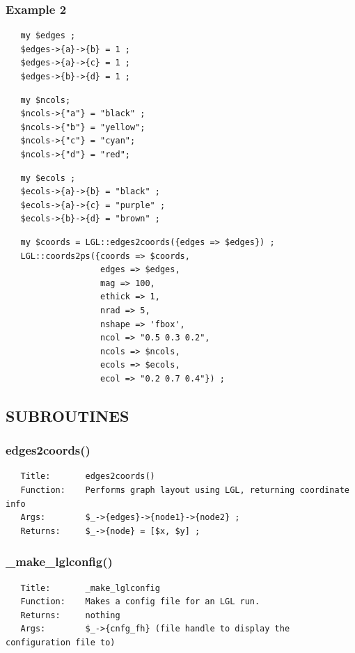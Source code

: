 \documentclass{article}
\begin{document}
\subsubsection*{Example 2\label{LGL_pm_Example_2}}
\begin{verbatim}
   my $edges ;
   $edges->{a}->{b} = 1 ;
   $edges->{a}->{c} = 1 ;
   $edges->{b}->{d} = 1 ;
\end{verbatim}
\begin{verbatim}
   my $ncols;
   $ncols->{"a"} = "black" ;
   $ncols->{"b"} = "yellow";
   $ncols->{"c"} = "cyan";
   $ncols->{"d"} = "red";
\end{verbatim}
\begin{verbatim}
   my $ecols ;
   $ecols->{a}->{b} = "black" ;
   $ecols->{a}->{c} = "purple" ;
   $ecols->{b}->{d} = "brown" ;
\end{verbatim}
\begin{verbatim}
   my $coords = LGL::edges2coords({edges => $edges}) ;
   LGL::coords2ps({coords => $coords,
                   edges => $edges,
                   mag => 100,
                   ethick => 1,
                   nrad => 5,
                   nshape => 'fbox',
                   ncol => "0.5 0.3 0.2",
                   ncols => $ncols,
                   ecols => $ecols,
                   ecol => "0.2 0.7 0.4"}) ;
\end{verbatim}
\subsection*{SUBROUTINES\label{LGL_pm_SUBROUTINES}}
\subsubsection*{edges2coords()\label{LGL_pm_edges2coords_}}
\begin{verbatim}
   Title:       edges2coords()
   Function:    Performs graph layout using LGL, returning coordinate info
   Args:        $_->{edges}->{node1}->{node2} ;
   Returns:     $_->{node} = [$x, $y] ;
\end{verbatim}
\subsubsection*{\_make\_lglconfig()\label{LGL_pm__make_lglconfig_}}
\begin{verbatim}
   Title:       _make_lglconfig
   Function:    Makes a config file for an LGL run.
   Returns:     nothing
   Args:        $_->{cnfg_fh} (file handle to display the configuration file to)
\end{verbatim}
\end{document}
